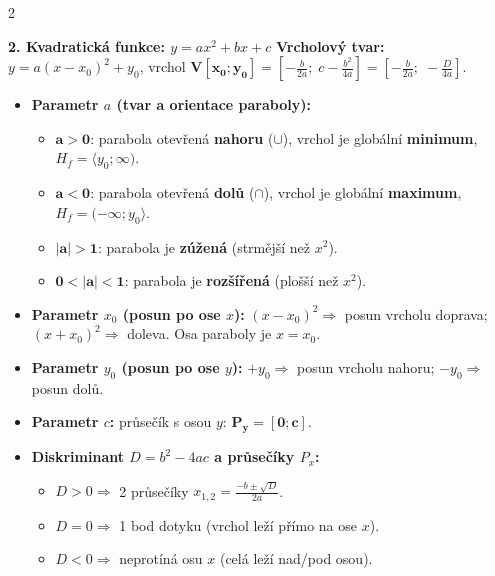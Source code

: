 \documentclass[9pt,a4paper]{article}
\begin{document}
\begin{tcolorbox}[secbox,title=OKRUH 4: LINEÁRNÍ A KVADRATICKÉ FUNKCE -- ROZBOR PARAMETRŮ A GRAFY]
\begin{multicols}{2}
\columnbreak

\textbf{\large 2. Kvadratická funkce: $y = ax^2 + bx + c$}
\textbf{Vrcholový tvar:} $y = a(x - x_0)^2 + y_0$, vrchol $\mathbf{V[x_0; y_0]} = \left[-\frac{b}{2a};\; c - \frac{b^2}{4a}\right] = \left[-\frac{b}{2a};\; -\frac{D}{4a}\right]$.
\begin{itemize}
  \item \textbf{Parametr $a$ (tvar a orientace paraboly):}
  \begin{itemize}
    \item $\mathbf{a > 0}$: parabola otevřená \textbf{nahoru} ($\cup$), vrchol je globální \textbf{minimum}, $H_f = \langle y_0; \infty)$.
    \item $\mathbf{a < 0}$: parabola otevřená \textbf{dolů} ($\cap$), vrchol je globální \textbf{maximum}, $H_f = (-\infty; y_0\rangle$.
    \item $\mathbf{|a| > 1}$: parabola je \textbf{zúžená} (strmější než $x^2$).
    \item $\mathbf{0 < |a| < 1}$: parabola je \textbf{rozšířená} (plošší než $x^2$).
  \end{itemize}
  \item \textbf{Parametr $x_0$ (posun po ose $x$):} $(x - x_0)^2 \Rightarrow$ posun vrcholu doprava; $(x + x_0)^2 \Rightarrow$ doleva. Osa paraboly je $x = x_0$.
  \item \textbf{Parametr $y_0$ (posun po ose $y$):} $+ y_0 \Rightarrow$ posun vrcholu nahoru; $- y_0 \Rightarrow$ posun dolů.
  \item \textbf{Parametr $c$:} průsečík s osou $y$: $\mathbf{P_y = [0; c]}$.
  \item \textbf{Diskriminant $D = b^2 - 4ac$ a průsečíky $P_x$:}
  \begin{itemize}
    \item $D > 0 \Rightarrow$ 2 průsečíky $x_{1,2} = \frac{-b \pm \sqrt{D}}{2a}$.
    \item $D = 0 \Rightarrow$ 1 bod dotyku (vrchol leží přímo na ose $x$).
    \item $D < 0 \Rightarrow$ neprotíná osu $x$ (celá leží nad/pod osou).
  \end{itemize}
\end{itemize}


\end{multicols}
\end{tcolorbox}
\end{document}
